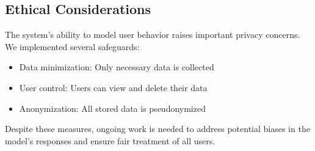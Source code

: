 \subsection{Ethical Considerations}
The system's ability to model user behavior raises important privacy concerns. We implemented several safeguards:
\begin{itemize}
    \item Data minimization: Only necessary data is collected
    \item User control: Users can view and delete their data
    \item Anonymization: All stored data is pseudonymized
\end{itemize}

Despite these measures, ongoing work is needed to address potential biases in the model's responses and ensure fair treatment of all users.
